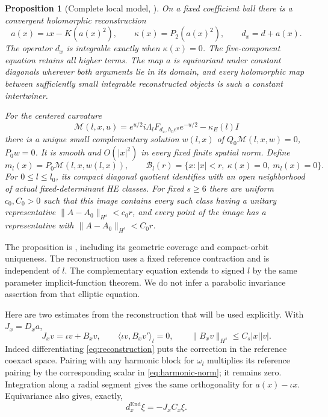 \documentclass[11pt]{amsart}
\newtheorem{proposition}[theorem]{Proposition}
\theoremstyle{definition}
\theoremstyle{remark}
\newcommand{\End}{\operatorname{End}}
\begin{document}
\begin{proposition}[Complete local model, \cite{WuebbenWall26}]
\label{prop:geometric-input}
On a fixed coefficient ball there is a convergent holomorphic
reconstruction
\begin{equation}\label{eq:reconstruction}
 a(x)=\iota x-K(a(x)^2),\qquad
 \kappa(x)=P_2(a(x)^2),\qquad d_x=d+a(x).
\end{equation}
The operator $d_x$ is integrable exactly when $\kappa(x)=0$.
The five-component equation retains all higher terms. The map $a$
is equivariant under constant diagonals wherever both arguments lie
in its domain, and every holomorphic map between sufficiently small
integrable reconstructed objects is such a constant intertwiner.

For the centered curvature
\begin{equation}\label{eq:centered-curvature}
 \mathcal M(l,x,u)=
 e^{u/2}i\Lambda_lF_{d_x,h_0e^u}e^{-u/2}-\kappa_E(l)I
\end{equation}
there is a unique small complementary solution $w(l,x)$ of
$Q_0\mathcal M(l,x,w)=0$, $P_0w=0$. It is smooth and
$O(|x|^2)$ in every fixed finite spatial norm. Define
\begin{equation}\label{eq:balanced-domain}
 m_l(x)=P_0\mathcal M(l,x,w(l,x)),\qquad
 \mathcal B_l(r)=\{x:|x|<r,\ \kappa(x)=0,\ m_l(x)=0\}.
\end{equation}
For $0\le l\le l_0$, its compact diagonal quotient identifies with an
open neighborhood of actual fixed-determinant HE classes. For fixed
$s\ge6$ there are uniform $c_0,C_0>0$ such that this image contains
every such class having a unitary representative
$\|A-A_0\|_{H^s}<c_0r$, and every point of the image has a
representative with $\|A-A_0\|_{H^s}<C_0r$.
\end{proposition}

The proposition is \cite[Sections 6 and 9]{WuebbenWall26}, including
its geometric coverage and compact-orbit uniqueness. The reconstruction
uses a fixed reference contraction and is independent of $l$.
The complementary equation extends to signed $l$ by the same
parameter implicit-function theorem. We do not infer a parabolic
invariance assertion from that elliptic equation.

Here are two estimates from the reconstruction that will be used
explicitly. With $J_x=D_xa$,
\begin{equation}\label{eq:harmonic-orthogonality}
 J_xv=\iota v+B_xv,\qquad
 \langle\iota v,B_xv'\rangle_l=0,\qquad
 \|B_xv\|_{H^s}\le C_s|x||v|.
\end{equation}
Indeed differentiating \eqref{eq:reconstruction} puts the correction
in the reference coexact space. Pairing with any harmonic block for
$\omega_l$ multiplies its reference pairing by the corresponding
scalar in \eqref{eq:harmonic-norm}; it remains zero. Integration
along a radial segment gives the same orthogonality for
$a(x)-\iota x$. Equivariance also gives, exactly,
\begin{equation}\label{eq:equivariant-derivative}
 d_x^{\End}\xi=-J_xC_x\xi .
\end{equation}
\end{document}
